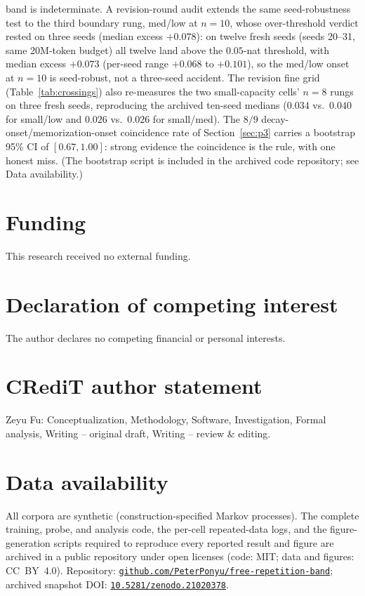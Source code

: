 \documentclass[11pt]{article}
\begin{document}
band is indeterminate. A revision-round audit extends the same seed-robustness test to
the third boundary rung, med/low at $n{=}10$, whose over-threshold verdict rested on
three seeds (median excess $+0.078$): on twelve fresh seeds (seeds 20--31, same 20M-token
budget) all twelve land above the $0.05$-nat threshold, with median excess $+0.073$
(per-seed range $+0.068$ to $+0.101$), so the med/low onset at $n{=}10$ is seed-robust,
not a three-seed accident. The revision fine grid (Table~\ref{tab:crossings}) also
re-measures the two small-capacity cells' $n{=}8$ rungs on three fresh seeds,
reproducing the archived ten-seed medians ($0.034$ vs.\ $0.040$ for small/low and
$0.026$ vs.\ $0.026$ for small/med). The $8/9$ decay-onset/memorization-onset coincidence rate of
Section~\ref{sec:p3} carries a bootstrap 95\% CI of $[0.67, 1.00]$: strong evidence the
coincidence is the rule, with one honest miss. (The bootstrap script is included in the
archived code repository; see Data availability.)

\section*{Funding}
This research received no external funding.

\section*{Declaration of competing interest}
The author declares no competing financial or personal interests.

\section*{CRediT author statement}
Zeyu Fu: Conceptualization, Methodology, Software, Investigation, Formal analysis,
Writing -- original draft, Writing -- review \& editing.

\section*{Data availability}
All corpora are synthetic (construction-specified Markov processes). The complete
training, probe, and analysis code, the per-cell repeated-data logs, and the
figure-generation scripts required to reproduce every reported result and figure are
archived in a public repository under open licenses (code: MIT; data and figures:
CC~BY~4.0). Repository:
\href{https://github.com/PeterPonyu/free-repetition-band}{\nolinkurl{github.com/PeterPonyu/free-repetition-band}};
archived snapshot DOI: \href{https://doi.org/10.5281/zenodo.21020378}{\texttt{10.5281/zenodo.21020378}}.
\end{document}
